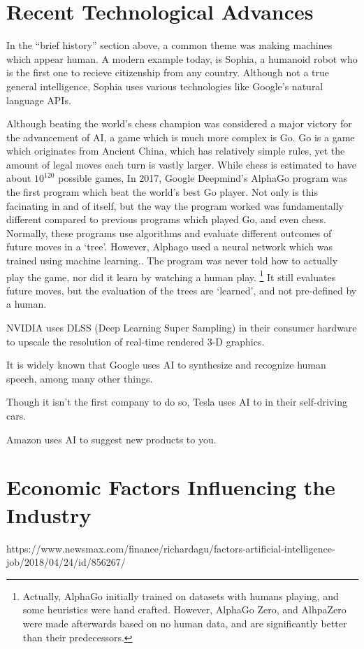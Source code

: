 \documentclass[letterpaper,12pt]{article}
\begin{document}
\section{Recent Technological Advances}

In the ``brief history'' section above, a common theme was making machines
which appear human. A modern example today, is Sophia, a humanoid robot
who is the first one to recieve citizenship from any country.
Although not a true general intelligence\cite{sopiaAI}, Sophia uses various 
technologies like Google's natural language APIs.

Although beating the world's chess champion was considered a major
victory for the advancement of AI,
a game which is much more complex is Go.
Go is a game which originates from Ancient China,
which has relatively simple rules, yet the amount of legal
moves each turn is vastly larger. While chess is estimated to have about $10^{120}$ 
possible games, 
In 2017, Google Deepmind's AlphaGo program was the first program which beat the world's
best Go player. Not only is this facinating in and of itself, but the 
way the program worked was fundamentally different compared to previous 
programs which played Go, and even chess. Normally, these programs
use algorithms and evaluate different outcomes of future moves
in a `tree'. However, Alphago used a neural network which was trained
using machine learning.\cite{alphagopaper}. The program was never told how to
actually play the game, nor did it learn by watching a human play.
\footnote{Actually, AlphaGo initially trained on datasets with humans playing,
and some heuristics were hand crafted. However, AlphaGo Zero, and AlhpaZero
were made afterwards based on no human data, and are significantly
better than their predecessors.} It still
evaluates future moves, but the evaluation of the trees are `learned', and 
not pre-defined by a human.


NVIDIA uses DLSS (Deep Learning Super Sampling) in their consumer hardware to
upscale the resolution of real-time rendered 3-D graphics.\cite{dlss}

It is widely known that Google uses AI to synthesize and recognize human speech,
among many other things.

Though it isn't the first company to do so, Tesla uses AI to in their self-driving cars.\cite{teslaautopilot}

Amazon uses AI to suggest new products to you.\cite{aznai}


\section{Economic Factors Influencing the Industry}
https://www.newsmax.com/finance/richardagu/factors-artificial-intelligence-job/2018/04/24/id/856267/
\end{document}
